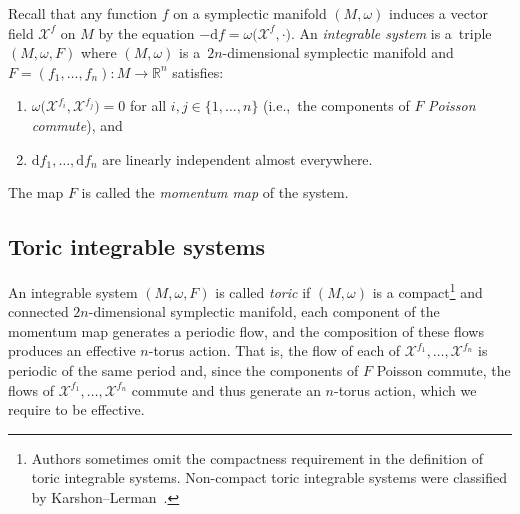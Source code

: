 \documentclass[10pt,a4paper]{amsart}
\numberwithin{equation}{section}
\def\R{{\mathbb R}}
\newcommand{\om}{\omega}
\theoremstyle{definition}
\theoremstyle{plain}
\theoremstyle{plain}
\begin{document}
Recall that any function $f$ on a symplectic manifold $(M,\om)$ induces a vector field $\mathcal{X}^f$ on $M$ by the equation $-\mathrm{d}f = \om\big(\mathcal{X}^f, \cdot\big)$.
An \emph{integrable system} is a~triple $(M,\om,F)$ where $(M,\om)$ is a~$2n$-dimensional symplectic manifold and $F=(f_1,\ldots, f_n)\colon M\to \R^n$ satisfies:
\begin{enumerate}\itemsep=0pt
 \item[(1)] $\om\big(\mathcal{X}^{f_i},\mathcal{X}^{f_j}\big)=0$ for all $i,j\in\{1,\ldots,n\}$ (i.e.,~the components of $F$ \emph{Poisson commute}), and
 \item[(2)] $\mathrm{d}f_1, \ldots, \mathrm{d}f_n$ are linearly independent almost everywhere.
\end{enumerate}
The map $F$ is called the \emph{momentum map} of the system.


\subsection{Toric integrable systems}
\label{sec:sympl-toric}
An integrable system $(M,\om,F)$ is called \emph{toric} if $(M,\om)$ is a compact\footnote{Authors sometimes omit the compactness requirement in the definition of toric integrable systems.
Non-compact toric integrable systems were classified by Karshon--Lerman~\cite{karshon-lerman}.} and connected $2n$-dimensional symplectic manifold, each component of the momentum map generates a periodic flow, and the composition of these flows produces an effective $n$-torus action.
That is, the flow of each of $\mathcal{X}^{f_1},\ldots,\mathcal{X}^{f_n}$ is periodic of the same period
and, since the components of $F$ Poisson commute, the flows of $\mathcal{X}^{f_1},\ldots,\mathcal{X}^{f_n}$ commute and thus generate an $n$-torus action, which we require to be effective.
\end{document}
